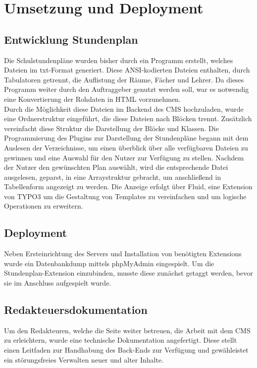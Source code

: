 \section{Umsetzung und Deployment} 
\label{sec:Umsetzung und Deployment}

\subsection{Entwicklung Stundenplan}
\label{sec:Entwicklung Stundenplan}
Die Schulstundenpl\"ane wurden bisher durch ein Programm erstellt, welches 
Dateien im txt-Format generiert. Diese \acs{ANSI}-kodierten Dateien enthalten, 
durch Tabulatoren getrennt, die Auflistung der R\"aume, F\"acher und Lehrer.
Da dieses Programm weiter durch den Auftraggeber genutzt werden soll, war 
es notwendig eine Konvertierung der Rohdaten in \acs{HTML} vorzunehmen.\\
Durch die M\"oglichkeit diese Dateien im Backend des \acs{CMS} hochzuladen, wurde eine 
Ordnerstruktur eingef\"uhrt, die diese Dateien nach Bl\"ocken trennt. 
Zus\"atzlich vereinfacht diese Struktur die Darstellung der Bl\"ocke und Klassen. Die Programmierung 
des Plugins zur Darstellung der Stundenpl\"ane begann mit dem Auslesen der Verzeichnisse, um einen 
\"uberblick \"uber alle verf\"ugbaren Dateien zu gewinnen und eine Auswahl f\"ur den Nutzer zur Verf\"ugung 
zu stellen. Nachdem der Nutzer den gew\"unschten Plan ausw\"ahlt, wird die entsprechende Datei 
ausgelesen, \acs{geparst}, in eine \acs{Array}struktur gebracht, um anschlie\ss{}end in Tabellenform angezeigt 
zu werden. Die Anzeige erfolgt \"uber Fluid, eine Extension von TYPO3 um die Gestaltung von Templates 
zu vereinfachen und um logische Operationen zu erweitern.

\subsection{Deployment}
\label{sec:Deployment}
Neben Ersteinrichtung des Servers und Installation von ben\"otigten \acs{Extension}s wurde ein 
\acs{Datenbankdump} mittels phpMyAdmin eingespielt. Um die Stundenplan-\acs{Extension} einzubinden,
musste diese zun\"achst \acs{getaggt} werden, bevor sie im Anschluss aufgespielt wurde.

\subsection{Redakteuersdokumentation}
\label{sec:Redakteuersdokumentation}
Um den Redakteuren, welche die Seite weiter betreuen, die Arbeit mit dem \acs{CMS} zu erleichtern, 
wurde eine technische Dokumentation angefertigt. Diese stellt einen Leitfaden zur Handhabung des 
\acs{Back-End}s zur Verf\"ugung und gew\"ahleistet ein st\"orungsfreies Verwalten neuer und alter Inhalte.